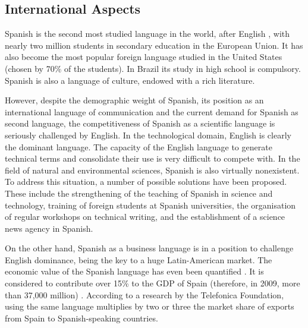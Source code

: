 \begin{multicols}{2}
\subsection{International Aspects}


Spanish is the second most studied language in the world, after English , with nearly two million students in secondary education in the European Union. It has also become the most popular foreign language studied in the United States (chosen by 70\% of the students). In Brazil its study in high school is compulsory. Spanish is also a language of culture, endowed with a rich literature. 


However, despite the demographic weight of Spanish, its position as an international language of communication and the current demand for Spanish as second language, the competitiveness of Spanish as a scientific language is seriously challenged by English. In the technological domain, English is clearly the dominant language. The capacity of the English language to generate technical terms and consolidate their use is very difficult to compete with. In the field of natural and environmental sciences, Spanish is also virtually nonexistent. To address this situation, a number of possible solutions have been proposed. These include the strengthening of the teaching of Spanish in science and technology, training of foreign students at Spanish universities, the organisation of regular workshops on technical writing, and the establishment of a science news agency in Spanish.


On the other hand, Spanish as a business language is in a position to challenge English dominance, being the key to a huge Latin-American market. The economic value of the Spanish language has even been quantified  \cite{ecospanish1}.  It is considered to contribute over 15\% to the GDP of Spain (therefore, in 2009, more than 37,000 million) \cite{ecospanish2}. According to a research by the Telefonica Foundation, using the same language multiplies by two or three the market share of exports from Spain to Spanish-speaking countries.


\end{multicols}
